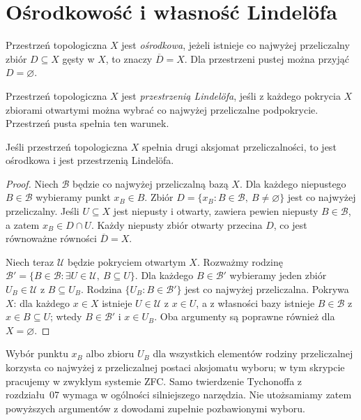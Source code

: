 \section{Ośrodkowość i własność Lindelöfa}
\label{sec:topog-osrodkowosc-lindelof}

\begin{definicja}[Ośrodkowość]
\label{def:topog-osrodkowosc}
Przestrzeń topologiczna $X$ jest \emph{ośrodkowa}, jeżeli
istnieje co najwyżej przeliczalny zbiór $D\subseteq X$
gęsty w $X$, to znaczy $\overline D=X$.
Dla przestrzeni pustej można przyjąć $D=\varnothing$.
\end{definicja}

\begin{definicja}
\label{def:topog-lindelof}
Przestrzeń topologiczna $X$ jest \emph{przestrzenią Lindelöfa},
jeśli z każdego pokrycia $X$ zbiorami otwartymi można
wybrać co najwyżej przeliczalne podpokrycie.
Przestrzeń pusta spełnia ten warunek.
\end{definicja}

\begin{twierdzenie}
\label{thm:topog-druga-osrodkowa-lindelof}
Jeśli przestrzeń topologiczna $X$ spełnia drugi aksjomat
przeliczalności,
to jest ośrodkowa i jest przestrzenią Lindelöfa.
\end{twierdzenie}
\begin{proof}
Niech $\mathcal B$ będzie co najwyżej przeliczalną bazą $X$.
Dla każdego niepustego $B\in\mathcal B$ wybieramy punkt $x_B\in B$.
Zbiór $D=\{x_B:B\in\mathcal B,\ B\ne\varnothing\}$
jest co najwyżej przeliczalny. Jeśli $U\subseteq X$ jest
niepusty i otwarty, zawiera pewien niepusty
$B\in\mathcal B$, a zatem $x_B\in D\cap U$.
Każdy niepusty zbiór otwarty przecina $D$,
co jest równoważne równości $\overline D=X$.

Niech teraz $\mathcal U$ będzie pokryciem otwartym $X$.
Rozważmy rodzinę
$\mathcal B'=\{B\in\mathcal B:\exists U\in\mathcal U,
\ B\subseteq U\}$. Dla każdego $B\in\mathcal B'$
wybieramy jeden zbiór $U_B\in\mathcal U$ z $B\subseteq U_B$.
Rodzina $\{U_B:B\in\mathcal B'\}$ jest co najwyżej
przeliczalna. Pokrywa $X$: dla każdego $x\in X$
istnieje $U\in\mathcal U$ z $x\in U$, a z własności bazy
istnieje $B\in\mathcal B$ z $x\in B\subseteq U$;
wtedy $B\in\mathcal B'$ i $x\in U_B$.
Oba argumenty są poprawne również dla $X=\varnothing$.
\end{proof}

\begin{uwaga}
\label{rem:topog-wybor-przeliczalnosc}
Wybór punktu $x_B$ albo zbioru $U_B$ dla wszystkich
elementów rodziny przeliczalnej korzysta co najwyżej
z przeliczalnej postaci aksjomatu wyboru; w tym skrypcie
pracujemy w zwykłym systemie ZFC. Samo twierdzenie
Tychonoffa z rozdziału~07 wymaga w ogólności silniejszego
narzędzia. Nie utożsamiamy zatem powyższych argumentów
z dowodami zupełnie pozbawionymi wyboru.
\end{uwaga}

